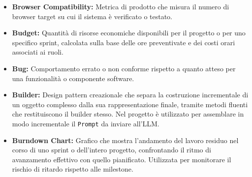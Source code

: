 \begin{itemize}[leftmargin=*]
      \item \textbf{Browser Compatibility:} Metrica di prodotto che misura il numero di
browser target su cui il sistema è verificato o testato.
      \item \textbf{Budget:} Quantità di risorse economiche disponibili per il progetto o per uno specifico sprint, calcolata sulla base delle ore preventivate e dei costi orari associati ai ruoli.
      \item \textbf{Bug:} Comportamento errato o non conforme rispetto a quanto atteso
      per una funzionalità o componente software.
      \item \textbf{Builder:} Design pattern creazionale che separa la costruzione incrementale di un oggetto complesso dalla sua rappresentazione finale, tramite metodi fluenti che restituiscono il builder stesso. Nel progetto è utilizzato per assemblare in modo incrementale il \texttt{Prompt} da inviare all'LLM.
      \item \textbf{Burndown Chart:} Grafico che mostra l'andamento del lavoro residuo nel
      corso di uno sprint o dell'intero progetto, confrontando il ritmo di avanzamento
      effettivo con quello pianificato. Utilizzata per monitorare il rischio di ritardo
      rispetto alle milestone.
\end{itemize}
 
{}
